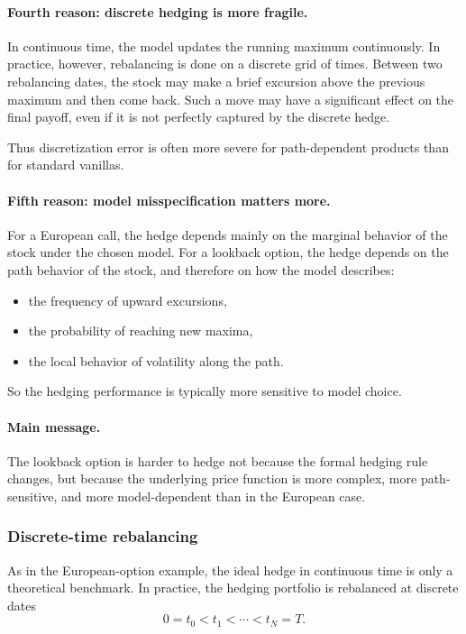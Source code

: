 \documentclass[11pt]{article}
\theoremstyle{plain}
\theoremstyle{definition}
\theoremstyle{remark}
\begin{document}
\paragraph{Fourth reason: discrete hedging is more fragile.}
In continuous time, the model updates the running maximum continuously.
In practice, however, rebalancing is done on a discrete grid of times.
Between two rebalancing dates, the stock may make a brief excursion
above the previous maximum and then come back.
Such a move may have a significant effect on the final payoff, even if
it is not perfectly captured by the discrete hedge.

Thus discretization error is often more severe for path-dependent
products than for standard vanillas.

\paragraph{Fifth reason: model misspecification matters more.}
For a European call, the hedge depends mainly on the marginal behavior
of the stock under the chosen model.
For a lookback option, the hedge depends on the path behavior of the
stock, and therefore on how the model describes:
\begin{itemize}[leftmargin=1.4em]
    \item the frequency of upward excursions,
    \item the probability of reaching new maxima,
    \item the local behavior of volatility along the path.
\end{itemize}

So the hedging performance is typically more sensitive to model choice.

\paragraph{Main message.}
The lookback option is harder to hedge not because the formal hedging
rule changes, but because the underlying price function is more complex,
more path-sensitive, and more model-dependent than in the European case.

\subsubsection{Discrete-time rebalancing}

As in the European-option example, the ideal hedge in continuous time is
only a theoretical benchmark.
In practice, the hedging portfolio is rebalanced at discrete dates
\[
0=t_0<t_1<\cdots<t_N=T.
\]
\end{document}
